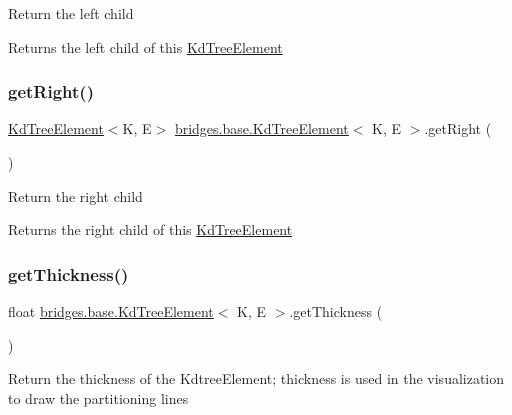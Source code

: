 Return the left child

\begin{DoxyReturn}{Returns}
the left child of this \mbox{\hyperlink{classbridges_1_1base_1_1_kd_tree_element}{Kd\+Tree\+Element}} 
\end{DoxyReturn}
\mbox{\label{classbridges_1_1base_1_1_kd_tree_element_a990694a36d44aba5f844f1752692c8e6}} 
\subsubsection{\texorpdfstring{getRight()}{getRight()}}
{\footnotesize\ttfamily \mbox{\hyperlink{classbridges_1_1base_1_1_kd_tree_element}{Kd\+Tree\+Element}}$<$K, E$>$ \mbox{\hyperlink{classbridges_1_1base_1_1_kd_tree_element}{bridges.\+base.\+Kd\+Tree\+Element}}$<$ K, E $>$.get\+Right (\begin{DoxyParamCaption}{ }\end{DoxyParamCaption})}

Return the right child

\begin{DoxyReturn}{Returns}
the right child of this \mbox{\hyperlink{classbridges_1_1base_1_1_kd_tree_element}{Kd\+Tree\+Element}} 
\end{DoxyReturn}
\mbox{\label{classbridges_1_1base_1_1_kd_tree_element_a27c0b086af284210855ee5f1c90e7484}} 
\subsubsection{\texorpdfstring{getThickness()}{getThickness()}}
{\footnotesize\ttfamily float \mbox{\hyperlink{classbridges_1_1base_1_1_kd_tree_element}{bridges.\+base.\+Kd\+Tree\+Element}}$<$ K, E $>$.get\+Thickness (\begin{DoxyParamCaption}{ }\end{DoxyParamCaption})}

Return the thickness of the Kdtree\+Element; thickness is used in the visualization to draw the partitioning lines

